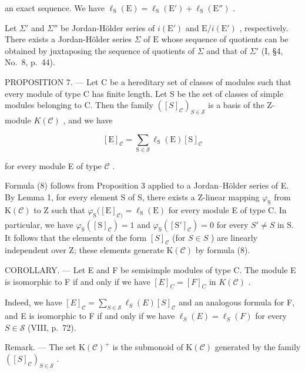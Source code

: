 an exact sequence. We have \(\ell_{\mathrm{S}}(\mathrm{E}) = \ell_{\mathrm{S}}(\mathrm{E}') + \ell_{\mathrm{S}}(\mathrm{E}'')\) .

Let \(\Sigma'\) and \(\Sigma''\) be Jordan-Hölder series of \(i(\mathrm{E}')\) and \(\mathrm{E}/i(\mathrm{E}')\) , respectively. There exists a Jordan-Hölder series \(\Sigma\) of \(\mathrm{E}\) whose sequence of quotients can be obtained by juxtaposing the sequence of quotients of \(\Sigma\) and that of \(\Sigma'\) (I, §4, No.~8, p.~44).

PROPOSITION 7. --- Let C be a hereditary set of classes of modules such that every module of type C has finite length. Let S be the set of classes of simple modules belonging to C. Then the family \(([S]_{\mathcal{C}})_{S \in \mathcal{S}}\) is a basis of the Z-module \(K(\mathcal{C})\) , and we have

\[
[ \mathrm{E} ] _ {\mathcal {C}} = \sum_ {\mathrm{S} \in \mathcal {S}} \ell_ {\mathrm{S}} (\mathrm{E}) [ \mathrm{S} ] _ {\mathcal {C}}\tag{8}
\]

for every module E of type \(\mathcal{C}\) .

Formula (8) follows from Proposition 3 applied to a Jordan--Hölder series of E. By Lemma 1, for every element S of S, there exists a Z-linear mapping \(\varphi_{\mathrm{S}}\) from \(\mathrm{K}(\mathcal{C})\) to Z such that \(\varphi_{\mathrm{S}}([\mathrm{E}]_{\mathcal{C})} = \ell_{\mathrm{S}}(\mathrm{E})\) for every module E of type C. In particular, we have \(\varphi_{\mathrm{S}}([\mathrm{S}]_{\mathcal{C}}) = 1\) and \(\varphi_{\mathrm{S}}([\mathrm{S}']_{\mathcal{C}}) = 0\) for every \(S' \neq S\) in S. It follows that the elements of the form \([S]_{\mathcal{C}}\) (for \(S \in S\) ) are linearly independent over Z; these elements generate \(\mathrm{K}(\mathcal{C})\) by formula (8).

COROLLARY. --- Let E and F be semisimple modules of type C. The module E is isomorphic to F if and only if we have \([E]_{C} = [F]_{C}\) in \(K(\mathcal{C})\) .

Indeed, we have \([E]_{\mathcal{C}} = \sum_{S \in \mathcal{S}} \ell_{S}(E)[S]_{\mathcal{C}}\) and an analogous formula for F, and E is isomorphic to F if and only if we have \(\ell_{S}(E) = \ell_{S}(F)\) for every \(S \in \mathcal{S}\) (VIII, p.~72).

Remark. --- The set \(\mathrm{K}(\mathcal{C})^{+}\) is the submonoid of \(\mathrm{K}(\mathcal{C})\) generated by the family \(([S]_{\mathcal{C}})_{S\in\mathcal{S}}\) .

